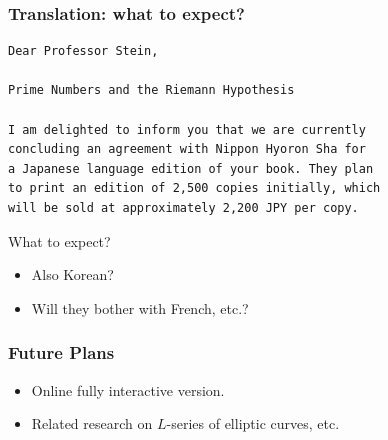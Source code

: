 \documentclass{beamer}
\begin{document}
\begin{frame}[fragile]
  \frametitle{Translation: what to expect?}
  \begin{verbatim}
Dear Professor Stein,

Prime Numbers and the Riemann Hypothesis

I am delighted to inform you that we are currently
concluding an agreement with Nippon Hyoron Sha for
a Japanese language edition of your book. They plan
to print an edition of 2,500 copies initially, which
will be sold at approximately 2,200 JPY per copy.
  \end{verbatim}

  What to expect?
  \begin{itemize}
    \item  Also Korean?
    \item  Will they bother with French, etc.?
  \end{itemize}
\end{frame}


\begin{frame}
  \frametitle{Future Plans}
  \begin{itemize}
    \item Online fully interactive version.
    \item Related research on $L$-series of elliptic curves, etc.
  \end{itemize}
\end{frame}
\end{document}
